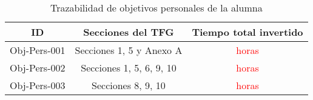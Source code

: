 \begin{table}[H]
    \centering
    \begin{tabular}{|c|c|c|}
    \hline
    \textbf{ID} & \textbf{Secciones del TFG} & \textbf{Tiempo total invertido} \\
    \hline
    Obj-Pers-001 & Secciones 1, 5 y Anexo A & \textcolor{red}{horas} \\
     \hline
    Obj-Pers-002 & Secciones 1, 5, 6, 9, 10  & \textcolor{red}{horas} \\
    \hline
    Obj-Pers-003 & Secciones 8, 9, 10 &  \textcolor{red}{horas} \\
    \hline
    \end{tabular}
\caption{Trazabilidad de objetivos personales de la alumna}
\label{tab:trazabilidadAlum}
\end{table}